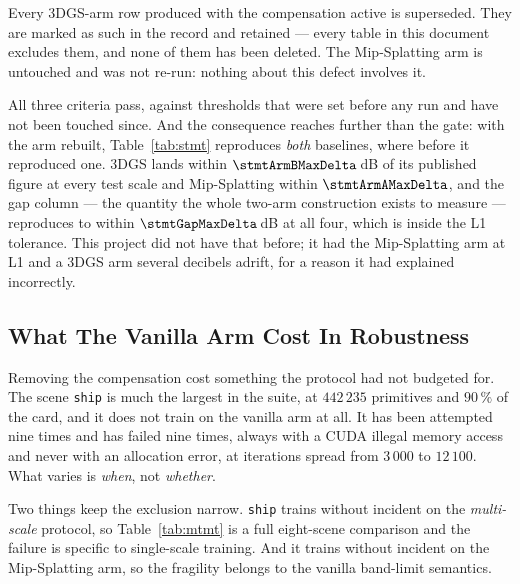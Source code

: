 Every 3DGS-arm row produced with the compensation active is superseded. They are
marked as such in the record and retained --- every table in this document
excludes them, and none of them has been deleted.
The Mip-Splatting arm is untouched and was not re-run: nothing about this defect involves it.



All three criteria pass, against thresholds that were set before any run and have
not been touched since. And the consequence reaches further than the gate: with
the arm rebuilt, Table~\ref{tab:stmt} reproduces \emph{both} baselines, where before it
reproduced one. 3DGS lands within $\stmtArmBMaxDelta$\,dB of its published figure at
every test scale and Mip-Splatting within $\stmtArmAMaxDelta$, and the gap column
--- the quantity the whole two-arm construction exists to measure --- reproduces
to within $\stmtGapMaxDelta$\,dB at all four, which is inside the L1 tolerance. This project did not have that before; it had the Mip-Splatting arm at L1 and a 3DGS arm several decibels adrift, for a
reason it had explained incorrectly.


\subsection*{What The Vanilla Arm Cost In Robustness}
\label{sec:shipfails}

Removing the compensation cost something the protocol had not budgeted for. The
scene \texttt{ship} is much the largest in the suite, at $442\,235$ primitives
and $90\,\%$ of the card, and it does not train on the vanilla arm at all. It
has
been attempted nine times and has failed nine times, always with a CUDA illegal
memory access and never with an allocation error, at iterations spread from
$3\,000$ to $12\,100$. What varies is \emph{when}, not \emph{whether}.

Two things keep the exclusion narrow. \texttt{ship} trains
without incident on the \emph{multi-scale} protocol, so Table~\ref{tab:mtmt} is a
full eight-scene comparison and the failure is specific to single-scale training.
And it trains without incident on the Mip-Splatting arm, so the fragility belongs to the vanilla band-limit semantics.

